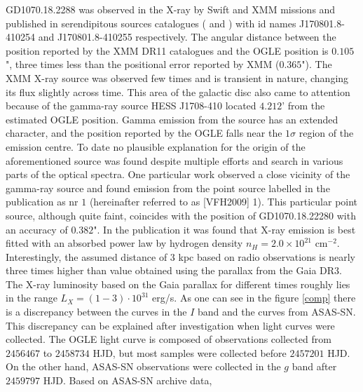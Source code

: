 \documentclass{pracalicmgr}
\begin{document}
GD1070.18.2288 was observed in the X-ray by Swift and XMM missions and published in serendipitous sources catalogues
(\citet{evans_2sxps_2020} and \citet{traulsen_xmm-newton_2020}) with id names J170801.8-410254 and J170801.8-410255
respectively. The angular distance between the position reported by the XMM DR11 catalogues \citep{traulsen_xmm-newton_2020} and the OGLE position is $0.105$",
three times less than the positional error reported by XMM ($0.365$").
The XMM X-ray source was observed few times and is transient in nature, changing its flux slightly across time.
This area of the galactic disc also came to attention because of the gamma-ray source HESS J1708-410 \citep{aharonian_hess_2008} located $4.212$' from the estimated OGLE position. 
Gamma emission from the source has an extended character, and the position reported by the OGLE falls near the $1\sigma$ region of the emission centre.
To date no plausible explanation for the origin
of the aforementioned source was found despite multiple efforts and search in various parts of the optical spectra.
One particular work \citep{van_etten_multi-wavelength_2009} observed a close vicinity of
the gamma-ray source and found emission from the point source labelled in the publication as nr $1$ (hereinafter referred to as [VFH2009] 1).
This particular point source, although quite faint, coincides with the position of GD1070.18.22280 with an accuracy of $0.382$". 
In the publication it was found that X-ray emission is best fitted with an absorbed power law by hydrogen density $n_H=2.0\times 10^{21}$ $\textrm{cm}^{-2}$.
Interestingly, the assumed distance of $3$ kpc based on radio observations is nearly three times higher than value obtained using the parallax from the Gaia DR3.
The X-ray luminosity based on the Gaia parallax for different times roughly lies in the range $L_{X}=(1-3)\cdot10^{31}$ erg/s.\hfil \break%
\hspace*{17.62482 pt} As one can see in the figure \ref{comp} there is a discrepancy between the curves in the $I$ band and the curves from ASAS-SN.
This discrepancy can be explained after investigation when light curves were collected. The OGLE
light curve is composed of observations collected from $2456467$ to $2458734$ HJD, but most samples were collected before $2457201$ HJD.
On the other hand, ASAS-SN observations were collected in the $g$ band after $2459797$ HJD. Based on ASAS-SN archive data,
\end{document}
